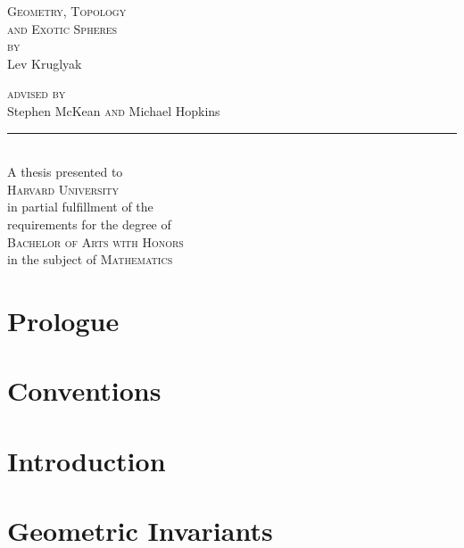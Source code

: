 \documentclass{lkx_thesis}
\begin{document}
\begin{titlepage}
	\begin{center}
		\vfill
		{\HUGE\scshape Geometry, Topology\\ and Exotic Spheres}\\[4em]

		{\Large \scshape by}\\[2em]
		{\huge Lev Kruglyak}\\[3in]

		{
		\Large
		{\scshape advised by\\[1em]}
		{Stephen McKean}
		{\scshape  and}
		{Michael Hopkins}\\[1em]
    \noindent\rule{1in}{0.6pt}\\[1em]
		A thesis presented to \\[1em]
		\textsc{Harvard University}\\[1em]
		in partial fulfillment of the \\
		requirements for the degree of\\[1em]

		\textsc{Bachelor of Arts with Honors}\\
		in the subject of \textsc{Mathematics}
		}
		\vfill
	\end{center}
\end{titlepage}

\lkxtoc

\chapter*{Prologue}\label{chap:prologue}


\chapter*{Conventions}\label{chap:conventions}


\chapter{Introduction}\label{chap:introduction}




\chapter{Geometric Invariants}\label{chap:detection}

\end{document}
